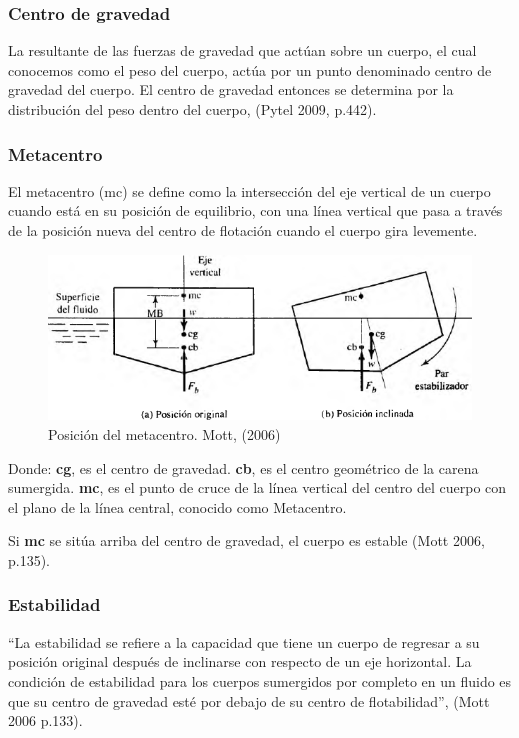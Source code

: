 \documentclass[letterpaper]{article}
\begin{document}
\subsubsection{Centro de gravedad}
\setlength{\parindent}{18pt}
La resultante de las fuerzas de gravedad que actúan sobre un cuerpo, el cual conocemos
como el peso del cuerpo, actúa por un punto denominado centro de gravedad
del cuerpo. El centro de gravedad entonces se determina por la distribución del peso
dentro del cuerpo, (Pytel 2009, p.442).

\subsubsection{Metacentro}
\setlength{\parindent}{18pt}
El metacentro (mc) se define como
la intersección del eje vertical de un cuerpo cuando está en su posición de equilibrio,
con una línea vertical que pasa a través de la posición nueva del centro de flotación
cuando el cuerpo gira levemente.
\begin{figure}[H]
	\centering
	\includegraphics[width=0.6 \textwidth]{Metacentro.png}
	\caption{ Posición del metacentro. Mott, (2006)}
	\label{fig:imagen0}
\end{figure}
Donde:
\newline
\textbf{cg}, es el centro de gravedad.
\newline
\textbf{cb}, es el centro geométrico de la carena sumergida.
\newline
\textbf{mc}, es el punto de cruce de la línea vertical del centro del cuerpo con el plano de la línea central, 
conocido como Metacentro.


Si \textbf{mc} se sitúa arriba del centro de gravedad, el cuerpo es estable (Mott 2006, p.135).

\subsubsection{Estabilidad}
\setlength{\parindent}{18pt}
``La estabilidad se refiere a la
capacidad que tiene un cuerpo
de regresar a su posición original
después de inclinarse con
respecto de un eje horizontal. La condición de estabilidad para los cuerpos sumergidos por completo en un
fluido es que su centro de gravedad esté por debajo de su centro de flotabilidad'', (Mott 2006 p.133).
\end{document}
